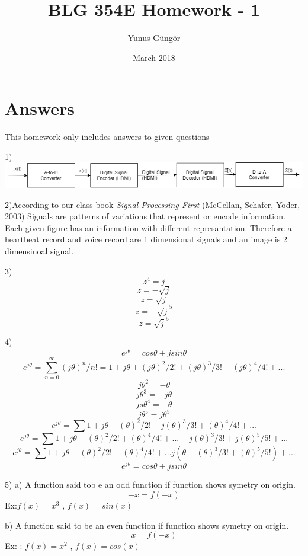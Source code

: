 \documentclass{article}
\title{BLG 354E Homework - 1}
\author{Yunus Güngör }
\date{March 2018}
\begin{document}
	
	\maketitle
	
	\section{Answers}
	
	This homework only includes answers to given questions
	
	1)\includegraphics[scale=0.4]{q1}
	\par
	
	2)According to our class book \textit{Signal Processing First} (McCellan, Schafer, Yoder, 2003) Signals are patterns of variations that represent or encode information. Each given figure has an information with different represantation. Therefore a heartbeat record and voice record are 1 dimensional signals and an image is 2 dimensinoal signal.\par
	
	3)
	$$z^4=j$$
	$$z=-\sqrt{j}$$
	$$z=\sqrt{j}$$
	$$z=-\sqrt{j}^5$$
	$$z=\sqrt{j}^5$$
	\par
	
	4)
	$$e^{j\theta}=cos\theta+jsin\theta$$
	$$e^{j\theta}=\sum_{n=0}^{\infty}{(j\theta)^n}/n!=1+j\theta+(j\theta)^2/{2!}+(j\theta)^3/{3!}+(j\theta)^4/{4!}+...$$
	$${j\theta}^2=-\theta$$
	$${j\theta}^3=-j\theta$$
	$${js\theta}^4=+\theta$$
	$${j\theta}^5=j{\theta}^5$$
	$$e^{j\theta}=\sum{1+j\theta-(\theta)^2/{2!}-j(\theta)^3/{3!}+(\theta)^4/{4!}+...}$$
	$$e^{j\theta}=\sum{1+j\theta-(\theta)^2/{2!}+(\theta)^4/{4!}+...-j(\theta)^3/{3!}+j(\theta)^5/{5!}}+...$$
	$$e^{j\theta}=\sum{1+j\theta-(\theta)^2/{2!}+(\theta)^4/{4!}+...j(\theta-(\theta)^3/{3!}+(\theta)^5/{5!})}+...$$
	$$e^{j\theta}=cos\theta+jsin\theta$$
	\par
	
	5)
	a) A function said tob e an odd function if function shows symetry on origin.
	$$-x=f(-x)$$
	Ex:$f(x)=x^3$ , $f(x)=sin(x)$
	
	\par
	b) A function said to be an even function if function shows symetry on origin. 
	$$x=f(-x)$$
	Ex: : $f(x)=x^2$ , $f(x)=cos(x)$
	\par
	
\end{document}

